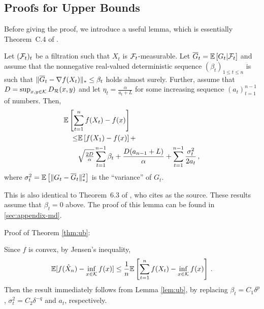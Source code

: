 \subsection{Proofs for Upper Bounds}
\label{sec:ub-proof}

Before giving the proof, we introduce a useful lemma, which is essentially Theorem~C.4 of \cite{MahdaviPhd:2014}.
\begin{lemma}
\label{lem:ub}
Let $(\mathcal{F}_t)_{t}$ be a filtration such that $X_t$ is $\mathcal{F}_t$-measurable.
Let $\overline G_t = \mathbb{E}\left[G_t|\mathcal{F}_t\right]$ 
and assume that the nonnegative real-valued deterministic sequence $(\beta_t)_{1\le t\le n}$ is such that 
$\|\overline G_t - \nabla f(X_t)\|_* \le \beta_t$ holds almost surely. 
Further, assume that $D=\sup_{x,y\in \mathcal{K}} D_{\mathcal{R}}(x,y)$ and let $\eta_t = \frac{\alpha}{a_t+L}$ for some increasing 
sequence $(a_t)_{t=1}^{n-1}$ of numbers. Then, 
\begin{align*}
\MoveEqLeft \EE{ \sum_{t=1}^n f(X_t) - f(x) }  \\
\le& 	 \EE{f(X_1)-f(x)}+ \\
 & \sqrt{\tfrac{2D}{\alpha}} \sum_{t=1}^{n-1} \beta_t 
 +\frac{D(a_{n-1}+L)}{\alpha} +
	  \sum_{t=1}^{n-1}\frac{\sigma_t^2}{2a_t}\,,
\end{align*}
where $\sigma_t^2 = \mathbb{E}\left[ \|G_t-\overline G_t\|_*^2\right]$ is the ``variance'' of $G_t$.
\end{lemma}
This is also identical to Theorem~6.3 of \cite{Bu:Convex14}, who cites \cite{Dekel:minibatch12} as the source. These results assume that $\beta_t=0$ above.
The proof of this lemma can be found in \cref{sec:appendix-md}.

Proof of Theorem \ref{thm:ub}:

Since $f$ is convex, by Jensen's inequality,
\[
 \mathbb{E}[f(\hat X_n) - \inf_{x \in \mathcal{K}} f(x)] \le  \dfrac{1}{n}\mathbb{E}\left[ \sum_{t=1}^n f(X_t) - \inf_{x \in \mathcal{K}}f(x) \right] \,.
\]
Then the result immediately follows from Lemma \ref{lem:ub}, by replacing
 $\beta_t = C_1\delta^p$, $\sigma^2_t = C_2 \delta^{-q}$ and $a_t$, respectively.